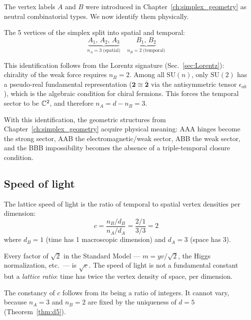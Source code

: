 The vertex labels $A$ and $B$ were introduced in Chapter~\ref{ch:simplex_geometry} as neutral combinatorial types. We now identify them physically.

The 5 vertices of the simplex split into spatial and temporal:
\begin{equation}
\underbrace{A_1,\,A_2,\,A_3}_{n_A = 3\;\text{(spatial)}} \quad \underbrace{B_1,\,B_2}_{n_B = 2\;\text{(temporal)}}
\end{equation}

This identification follows from the Lorentz signature (Sec.~\ref{sec:Lorentz}): chirality of the weak force requires $n_B = 2$. Among all $\text{SU}(n)$, only $\text{SU}(2)$ has a pseudo-real fundamental representation ($\mathbf{2} \cong \bar{\mathbf{2}}$ via the antisymmetric tensor $\epsilon_{ab}$), which is the algebraic condition for chiral fermions. This forces the temporal sector to be $\mathbb{C}^2$, and therefore $n_A = d - n_B = 3$.

With this identification, the geometric structures from Chapter~\ref{ch:simplex_geometry} acquire physical meaning: AAA hinges become the strong sector, AAB the electromagnetic/weak sector, ABB the weak sector, and the BBB impossibility becomes the absence of a triple-temporal closure condition.

\subsection{Speed of light}

The lattice speed of light is the ratio of temporal to spatial vertex densities per dimension:
\begin{equation}
\boxed{c = \frac{n_B / d_B}{n_A / d_A} = \frac{2/1}{3/3} = 2}
\label{eq:speed_of_light}
\end{equation}
where $d_B = 1$ (time has 1 macroscopic dimension) and $d_A = 3$ (space has 3).

Every factor of $\sqrt{2}$ in the Standard Model --- $m = yv/\sqrt{2}$, the Higgs normalization, etc.\ --- is $\sqrt{c}$. The speed of light is not a fundamental constant but a \emph{lattice ratio}: time has twice the vertex density of space, per dimension.

\begin{remark}
The constancy of $c$ follows from its being a ratio of integers. It cannot vary, because $n_A = 3$ and $n_B = 2$ are fixed by the uniqueness of $d = 5$ (Theorem~\ref{thm:d5}).
\end{remark}

